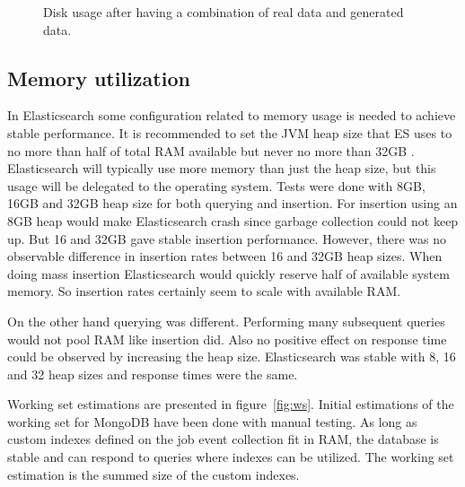 \begin{figure}[h!]
\centering
{}
\caption{Disk usage after having a combination of real data and generated data.}
\label{fig:discbig}
\end{figure}

\subsection{Memory utilization}

In Elasticsearch some configuration related to memory usage is needed to achieve stable performance. It is recommended to set the JVM heap size that ES uses to no more than half of total RAM available but never no more than 32GB \cite{ESmemory}. Elasticsearch will typically use more memory than just the heap size, but this usage will be delegated to the operating system. Tests were done with 8GB, 16GB and 32GB heap size for both querying and insertion. For insertion using an 8GB heap would make Elasticsearch crash since garbage collection could not keep up. But 16 and 32GB gave stable insertion performance. However, there was no observable difference in insertion rates between 16 and 32GB heap sizes. When doing mass insertion Elasticsearch would quickly reserve half of available system memory. So insertion rates certainly seem to scale with available RAM.

On the other hand querying was different. Performing many subsequent queries would not pool RAM like insertion did. Also no positive effect on response time could be observed by increasing the heap size. Elasticsearch was stable with 8, 16 and 32 heap sizes and response times were the same.



Working set estimations are presented in figure~\ref{fig:ws}. Initial estimations of the working set for MongoDB have been done with manual testing. As long as custom indexes defined on the job event collection fit in RAM, the database is stable and can respond to queries where indexes can be utilized. The working set estimation is the summed size of the custom indexes. 


